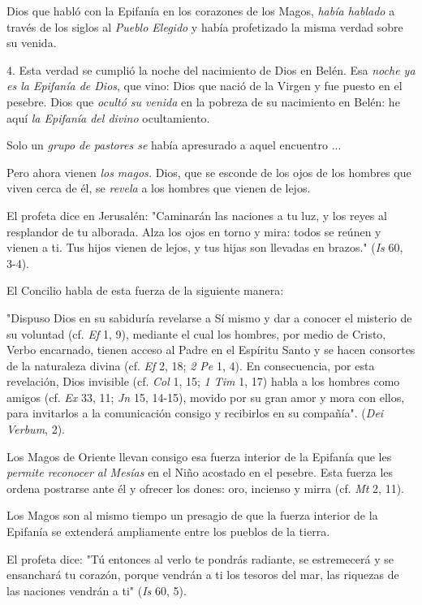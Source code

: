 Dios que habló con la Epifanía en los corazones de los Magos,
\emph{había hablado} a través de los siglos al \emph{Pueblo Elegido} y
había profetizado la misma verdad sobre su venida.

4. Esta verdad se cumplió la noche del nacimiento de Dios en Belén. Esa
\emph{noche ya es la Epifanía de Dios}, que vino: Dios que nació de la
Virgen y fue puesto en el pesebre. Dios que \emph{ocultó su venida} en
la pobreza de su nacimiento en Belén: he aquí \emph{la Epifanía del
	divino} ocultamiento.

Solo un \emph{grupo de pastores se} había apresurado a aquel encuentro
...

Pero ahora vienen \emph{los magos.} Dios, que se esconde de los ojos de
los hombres que viven cerca de él, se \emph{revela} a los hombres que
vienen de lejos.

El profeta dice en Jerusalén: "Caminarán las naciones a tu luz, y los
reyes al resplandor de tu alborada. Alza los ojos en torno y mira: todos
se reúnen y vienen a ti. Tus hijos vienen de lejos, y tus hijas son
llevadas en brazos." (\emph{Is} 60, 3-4).

El Concilio habla de esta fuerza de la siguiente manera:

"Dispuso Dios en su sabiduría revelarse a Sí mismo y dar a conocer el
misterio de su voluntad (cf. \emph{Ef} 1, 9), mediante el cual los
hombres, por medio de Cristo, Verbo encarnado, tienen acceso al Padre en
el Espíritu Santo y se hacen consortes de la naturaleza divina (cf.
\emph{Ef} 2, 18; \emph{2 Pe} 1, 4). En consecuencia, por esta
revelación, Dios invisible (cf. \emph{Col} 1, 15; \emph{1 Tim} 1, 17)
habla a los hombres como amigos (cf. \emph{Ex} 33, 11; \emph{Jn} 15,
14-15), movido por su gran amor y mora con ellos, para invitarlos a la
comunicación consigo y recibirlos en su compañía". (\emph{Dei Verbum},
2).

Los Magos de Oriente llevan consigo esa fuerza interior de la Epifanía
que les \emph{permite reconocer al Mesías} en el Niño acostado en el
pesebre. Esta fuerza les ordena postrarse ante él y ofrecer los dones:
oro, incienso y mirra (cf. \emph{Mt} 2, 11).

Los Magos son al mismo tiempo un presagio de que la fuerza interior de
la Epifanía se extenderá ampliamente entre los pueblos de la tierra.

El profeta dice: "Tú entonces al verlo te pondrás radiante, se
estremecerá y se ensanchará tu corazón, porque vendrán a ti los tesoros
del mar, las riquezas de las naciones vendrán a ti" (\emph{Is} 60, 5).

